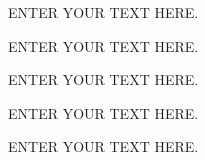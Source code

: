 \documentclass[12pt]{article}
\begin{document}
%
%
\justification          %
ENTER YOUR TEXT HERE.


%
%
\describeobservations   %
ENTER YOUR TEXT HERE.


%
%
\specialreq             %
ENTER YOUR TEXT HERE.


%
%
\coordinatedobs          %
ENTER YOUR TEXT HERE.


%
%
\duplications           %
ENTER YOUR TEXT HERE.

\end{document}
